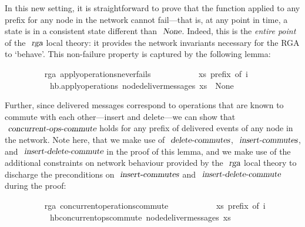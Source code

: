 \documentclass[acmlarge,review,anonymous]{acmart}\settopmatter{printfolios=true}
\begin{document}
In this new setting, it is straightforward to prove that the function  applied to any prefix for any node in the network cannot fail---that is, at any point in time, a state is in a consistent state different than $\isa{None}$.
Indeed, this is the \emph{entire point} of the $\isa{rga}$ local theory: it provides the network invariants necessary for the RGA to `behave'.
This non-failure property is captured by the following lemma:
\\
\begin{isabellebody}
\ \ \ \ \ \ \ \  {\isacharparenleft}\ rga{\isacharparenright}\ apply{\isacharunderscore}operations{\isacharunderscore}never{\isacharunderscore}fails{\isacharcolon}\isanewline
\ \ \ \ \ \ \ \ \ \ \ {\isachardoublequoteopen}xs\ prefix\ of\ i{\isachardoublequoteclose}\isanewline
\ \ \ \ \ \ \ \ \ \ \ {\isachardoublequoteopen}hb.apply{\isacharunderscore}operations\ {\isacharparenleft}node{\isacharunderscore}deliver{\isacharunderscore}messages\ xs{\isacharparenright}\ {\isasymnoteq}\ None{\isachardoublequoteclose}
\end{isabellebody}
\vspace{\baselineskip}
Further, since delivered messages correspond to operations that are known to commute with each other---insert and delete---we can show that $\isa{concurrent-ops-commute}$ holds for any prefix of delivered events of any node in the network.
Note here, that we make use of $\isa{delete-commutes}$, $\isa{insert-commutes}$, and $\isa{insert-delete-commute}$ in the proof of this lemma, and we make use of the additional constraints on network behaviour provided by the $\isa{rga}$ local theory to discharge the preconditions on $\isa{insert-commutes}$ and $\isa{insert-delete-commute}$ during the proof:
\\
\begin{isabellebody}
\ \ \ \ \ \ \ \  {\isacharparenleft}\ rga{\isacharparenright}\ concurrent{\isacharunderscore}operations{\isacharunderscore}commute{\isacharcolon}\isanewline
\ \ \ \ \ \ \ \ \ \ \ {\isachardoublequoteopen}xs\ prefix\ of\ i{\isachardoublequoteclose}\isanewline
\ \ \ \ \ \ \ \ \ \ \ {\isachardoublequoteopen}hb{\isachardot}concurrent{\isacharunderscore}ops{\isacharunderscore}commute\ {\isacharparenleft}node{\isacharunderscore}deliver{\isacharunderscore}messages\ xs{\isacharparenright}{\isachardoublequoteclose}
\end{isabellebody}
\end{document}
